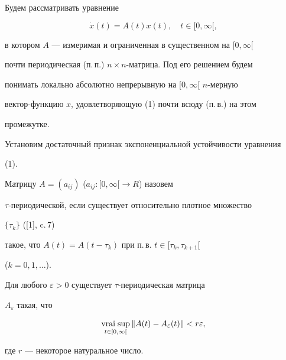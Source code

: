 \pagestyle{plain} %


 




\maketitle 


\label{begin} 


 


 


Будем рассматривать уравнение 


\begin{equation} 


\Dot x(t)=A(t)x(t),\quad t\in[0,\infty[,


\end{equation} 


в котором $A$ --- измеримая и ограниченная в существенном на $[0,\infty[$ 


почти периодическая (п.\,п.) $n\times n$-матрица. Под его решением будем 


понимать локально абсолютно непрерывную на $[0,\infty[$ $n$-мерную 


вектор-функцию $x$, удовлетворяющую (1) почти всюду (п.\,в.) на этом 


промежутке. 


 


Установим достаточный признак экспоненциальной устойчивости уравнения 


(1). 


 


\begin{defnnonum} 


Матрицу $A=(a_{ij})$ ($a_{ij}:[0,\infty[\to R$) назовем 


$\tau$-периодической, если существует относительно плотное множество 


$\{\tau_k\}$ ([1], c.\,7)


такое, что $A(t)=A(t-\tau_k)$ при п.\,в. $t\in[\tau_k,\tau_{k+1}[$ 


($k=0,1,\dotsc$). 


\end{defnnonum} 


 


\begin{lem} 


Для любого $\varepsilon>0$ существует $\tau$-периодическая матрица 


$A_\varepsilon$ такая, что 


\begin{equation} 


\vraisup_{t\in[0,\infty[}\|A(t)-A_\varepsilon(t)\|<r\varepsilon, 


\end{equation} 


где $r$ --- некоторое натуральное число. 


\end{lem} 


